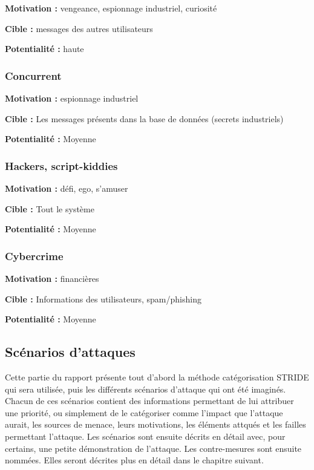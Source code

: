 \documentclass{article}
\begin{document}
\textbf{Motivation :} vengeance, espionnage industriel, curiosité

\textbf{Cible :} messages des autres utilisateurs

\textbf{Potentialité :} haute

\subsubsection{Concurrent}

\textbf{Motivation :} espionnage industriel

\textbf{Cible :} Les messages présents dans la base de données (secrets
industriels)

\textbf{Potentialité :} Moyenne

\subsubsection{Hackers, script-kiddies}

\textbf{Motivation :} défi, ego, s'amuser

\textbf{Cible :} Tout le système

\textbf{Potentialité :} Moyenne

\subsubsection{Cybercrime}

\textbf{Motivation :} financières

\textbf{Cible :} Informations des utilisateurs, spam/phishing

\textbf{Potentialité :} Moyenne

\subsection{Scénarios d'attaques}

Cette partie du rapport présente tout d'abord la méthode catégorisation
STRIDE qui sera utilisée, puis les différents scénarios d'attaque qui
ont été imaginés. Chacun de ces scénarios contient des informations
permettant de lui attribuer une priorité, ou simplement de le
catégoriser comme l'impact que l'attaque aurait, les sources de menace,
leurs motivations, les éléments attqués et les failles permettant
l'attaque. Les scénarios sont ensuite décrits en détail avec, pour
certains, une petite démonstration de l'attaque. Les contre-mesures sont
ensuite nommées. Elles seront décrites plus en détail dans le chapitre
suivant.
\end{document}
